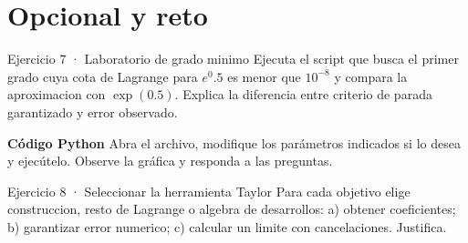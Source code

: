 \documentclass[10pt,a4paper,oneside,openany]{book}
\begin{document}
\section*{Opcional y reto}
\begin{PSevenOptional}{Ejercicio 7 · Laboratorio de grado minimo}
Ejecuta el script que busca el primer grado cuya cota de Lagrange para \(e^{0}.5\) es menor que \(10^{-8}\) y compara la aproximacion con \(\exp(0.5)\). Explica la diferencia entre criterio de parada garantizado y error observado.
\par\medskip\textbf{Código Python}
Abra el archivo, modifique los parámetros indicados si lo desea y
ejecútelo. Observe la gráfica y responda a las preguntas.\par\smallskip
{}
\end{PSevenOptional}
\begin{PSevenOptionalFixed}{Ejercicio 8 · Seleccionar la herramienta Taylor}
Para cada objetivo elige construccion, resto de Lagrange o algebra de desarrollos: a) obtener coeficientes; b) garantizar error numerico; c) calcular un limite con cancelaciones. Justifica.
\end{PSevenOptionalFixed}
\end{document}
